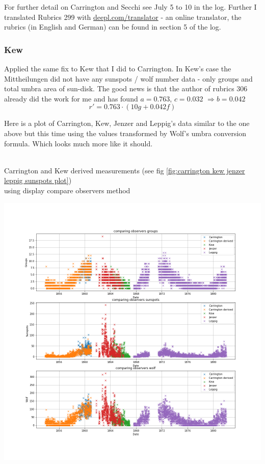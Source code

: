 \documentclass[12pt]{article}
\newcommand{\RA}{\Rightarrow}
\begin{document}
For further detail on Carrington and Secchi see July 5 to 10 in the log. Further I translated Rubrics 299 with \href{https://www.deepl.com/translator}{deepl.com/translator} - an online translator, the rubrics (in English and German) can be found in section 5 of the log.

\subsubsection{Kew}

Applied the same fix to Kew that I did to Carrington. In Kew's case the Mittheilungen did not have any sunspots / wolf number data - only groups and total umbra area of sun-disk. The good news is that the author of rubrics 306 already did the work for me and has found $a = 0.763$, $c = 0.032$ $\RA b = 0.042$
$$r' = 0.763 \cdot (10 g + 0.042 f)$$

Here is a plot of Carrington, Kew, Jenzer and Leppig's data similar to the one above but this time using the values transformed by Wolf's umbra conversion formula. Which looks much more like it should.\\

\\
{\centering
\caption{Carrington and Kew derived measurements (see fig \ref{fig:carrington kew jenzer leppig sunspots plot})\\using display compare observers method}
\includegraphics[width=\linewidth]{carrington_kew_after_fix.png}
\label{fig:carrington, kew, leppig, jenzer after fix}
\par}
\end{document}
